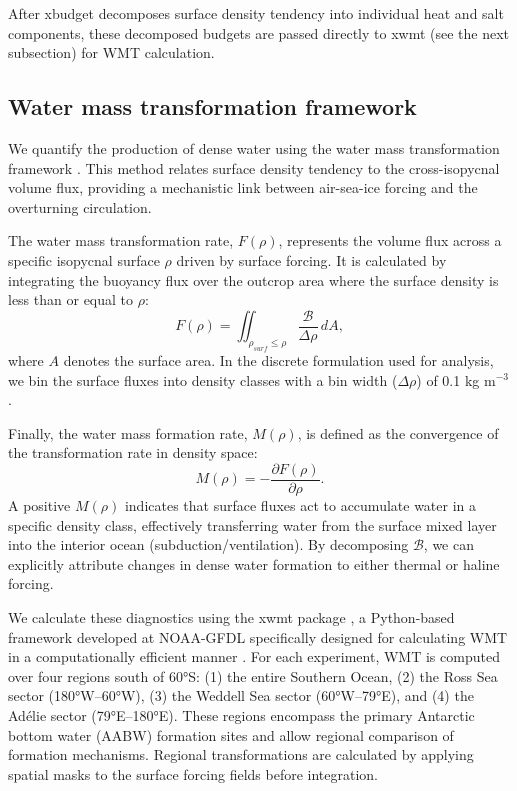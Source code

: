 \documentclass[pdflatex,sn-nature]{sn-jnl}
\begin{document}
After xbudget decomposes surface density tendency into individual heat and salt components, these decomposed budgets are passed directly to xwmt (see the next subsection) for WMT calculation.


\subsection{Water mass transformation framework}

We quantify the production of dense water using the water mass transformation framework \cite{Walin1982,Speer1992}. This method relates surface density tendency to the cross-isopycnal volume flux, providing a mechanistic link between air-sea-ice forcing and the overturning circulation.

The water mass transformation rate, $F(\rho)$, represents the volume flux across a specific isopycnal surface $\rho$ driven by surface forcing. It is calculated by integrating the buoyancy flux over the outcrop area where the surface density is less than or equal to $\rho$:
\begin{equation}
F(\rho) = \iint_{\rho_{surf} \le \rho} \frac{\mathcal{B}}{\Delta \rho} \, dA,
\end{equation}
where $A$ denotes the surface area. In the discrete formulation used for analysis, we bin the surface fluxes into density classes with a bin width ($\Delta \rho$) of 0.1 kg m$^{-3}$.

Finally, the water mass formation rate, $M(\rho)$, is defined as the convergence of the transformation rate in density space:
\begin{equation}
M(\rho) = - \frac{\partial F(\rho)}{\partial \rho}.
\end{equation}
A positive $M(\rho)$ indicates that surface fluxes act to accumulate water in a specific density class, effectively transferring water from the surface mixed layer into the interior ocean (subduction/ventilation). By decomposing $\mathcal{B}$, we can explicitly attribute changes in dense water formation to either thermal or haline forcing.

We calculate these diagnostics using the xwmt package \cite{xwmt2024}, a Python-based framework developed at NOAA-GFDL specifically designed for calculating WMT in a computationally efficient manner \cite{drake2025water}. For each experiment, WMT is computed over four regions south of 60°S: (1) the entire Southern Ocean, (2) the Ross Sea sector (180°W--60°W), (3) the Weddell Sea sector (60°W--79°E), and (4) the Adélie sector (79°E--180°E). These regions encompass the primary Antarctic bottom water (AABW) formation sites and allow regional comparison of formation mechanisms. Regional transformations are calculated by applying spatial masks to the surface forcing fields before integration.
\end{document}
